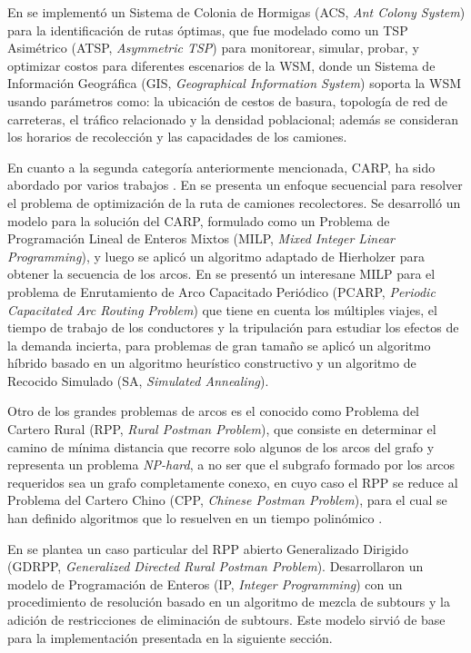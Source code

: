 \documentclass[spanish, conference]{IEEEtran}
\begin{document}
En \cite{Karadimas2007OptimalAlgorithm} se implementó un Sistema de Colonia de Hormigas (ACS, \textit{Ant Colony System}) para la identificación de rutas óptimas, que fue modelado como un TSP Asimétrico (ATSP, \textit{Asymmetric TSP}) para monitorear, simular, probar, y optimizar costos para diferentes escenarios de la WSM, donde un Sistema de Información Geográfica (GIS, \textit{Geographical Information System}) soporta la WSM usando parámetros como: la ubicación de cestos de basura, topología de red de carreteras, el tráfico relacionado y la densidad poblacional; además se consideran los horarios de recolección y las capacidades de los camiones.

En cuanto a la segunda categoría anteriormente mencionada, CARP, ha sido abordado por varios trabajos \cite{Vecchi2016ACollection,Tirkolaee2018ATime,Braier2017AnArgentina}. En \cite{Vecchi2016ACollection} se presenta un enfoque secuencial para resolver el problema de optimización de la ruta de camiones recolectores. Se desarrolló un modelo para la solución del CARP, formulado como un Problema de Programación Lineal de Enteros Mixtos (MILP, \textit{Mixed Integer Linear Programming}), y luego se aplicó un algoritmo adaptado de Hierholzer para obtener la secuencia de los arcos. En \cite{Tirkolaee2018ATime} se presentó un interesane MILP para el problema de Enrutamiento de Arco Capacitado Periódico (PCARP, \textit{Periodic Capacitated Arc Routing Problem}) que tiene en cuenta los múltiples viajes, el tiempo de trabajo de los conductores y la tripulación para estudiar los efectos de la demanda incierta, para problemas de gran tamaño se aplicó un algoritmo híbrido basado en un algoritmo heurístico constructivo y un algoritmo de Recocido Simulado (SA, \textit{Simulated Annealing}).

Otro de los grandes problemas de arcos es el conocido como Problema del Cartero Rural (RPP, \textit{Rural Postman Problem}), que consiste en determinar el camino de mínima distancia que recorre solo algunos de los arcos del grafo y representa un problema \textit{NP-hard}, a no ser que el subgrafo formado por los arcos requeridos sea un grafo completamente conexo, en cuyo caso el RPP se reduce al Problema del Cartero Chino (CPP, \textit{Chinese Postman Problem}), para el cual se han definido algoritmos que lo resuelven en un tiempo polinómico \cite{CalvinoM2011CooperacionPanoramica}.

En \cite{Braier2017AnArgentina} se plantea un caso particular del RPP abierto Generalizado Dirigido (GDRPP, \textit{Generalized Directed Rural Postman Problem}). Desarrollaron un modelo de Programación de Enteros (IP, \textit{Integer Programming}) con un procedimiento de resolución basado en un algoritmo de mezcla de subtours y la adición de restricciones de eliminación de subtours. Este modelo sirvió de base para la implementación presentada en la siguiente sección.
\end{document}
